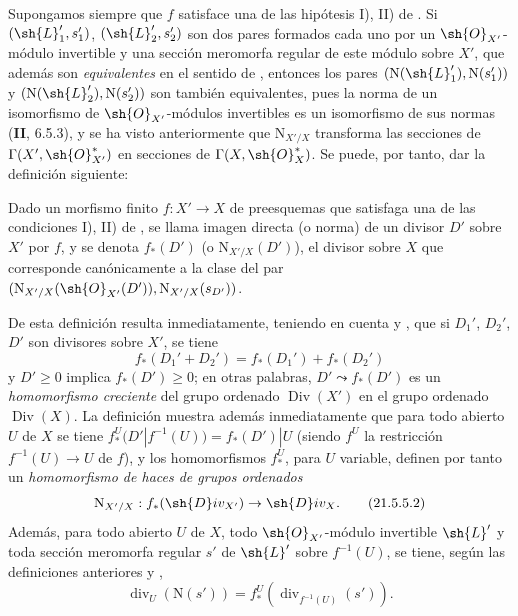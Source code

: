 \begin{env}[21.5.4]
\label{IV.21.5.4}
Supongamos siempre que $f$ satisface una de las hipótesis I), II) de .
Si $(\sh{L}_1',s_1')$, $(\sh{L}_2',s_2')$ son dos pares formados cada uno por un $\sh{O}_{X'}$-módulo invertible y una sección meromorfa regular de este módulo sobre $X'$, que además son \emph{equivalentes} en el sentido de , entonces los pares $(\mathrm{N}(\sh{L}_1'),\mathrm{N}(s_1'))$ y $(\mathrm{N}(\sh{L}_2'),\mathrm{N}(s_2'))$ son también equivalentes, pues la norma de un isomorfismo de $\sh{O}_{X'}$-módulos invertibles es un isomorfismo de sus normas (\textbf{II}, 6.5.3), y se ha visto anteriormente que $\mathrm{N}_{X'/X}$ transforma las secciones de $\Gamma(X',\sh{O}_{X'}^*)$ en secciones de $\Gamma(X,\sh{O}_X^*)$.
Se puede, por tanto, dar la definición siguiente:
\end{env}


\begin{definition}[21.5.5]
\label{IV.21.5.5}
Dado un morfismo finito $f:X'\to X$ de preesquemas que satisfaga una de las condiciones \textup{I), II)} de , se llama imagen directa (o norma) de un divisor $D'$ sobre $X'$ por $f$, y se denota $f_*(D')$ \textup{(}o $\mathrm{N}_{X'/X}(D')$\textup{)}, el divisor sobre $X$ que corresponde canónicamente  a la clase del par $(\mathrm{N}_{X'/X}(\sh{O}_{X'}(D')),\mathrm{N}_{X'/X}(s_{D'}))$.
\end{definition}

De esta definición resulta inmediatamente, teniendo en cuenta  y , que si $D_1'$, $D_2'$, $D'$ son divisores sobre $X'$, se tiene
\[
\label{IV.21.5.5.1}
  f_*(D_1'+D_2')=f_*(D_1')+f_*(D_2')
  \tag{21.5.5.1}
\]
y $D'\geq0$ implica $f_*(D')\geq0$; en otras palabras, $D'\leadsto f_*(D')$ es un \emph{homomorfismo creciente} del grupo ordenado $\operatorname{Div}(X')$ en el grupo ordenado $\operatorname{Div}(X)$.
La definición  muestra además inmediatamente que para todo abierto $U$ de $X$ se tiene $f_*^U(D'|f^{-1}(U))=f_*(D')|U$ (siendo $f^U$ la restricción $f^{-1}(U)\to U$ de $f$), y los homomorfismos $f_*^U$, para $U$ variable, definen por tanto un \emph{homomorfismo de haces de grupos ordenados}
\[
\label{IV.21.5.5.2}
  \mathrm{N}_{X'/X}:f_*(\sh{D}iv_{X'})\to\sh{D}iv_X.
  \tag{21.5.5.2}
\]
Además, para todo abierto $U$ de $X$, todo $\sh{O}_{X'}$-módulo invertible $\sh{L}'$ y toda sección meromorfa regular $s'$ de $\sh{L}'$ sobre $f^{-1}(U)$, se tiene, según las definiciones anteriores y ,
\[
\label{IV.21.5.5.3}
  \operatorname{div}_U(\mathrm{N}(s'))=f_*^U(\operatorname{div}_{f^{-1}(U)}(s')).
  \tag{21.5.5.3}
\]


